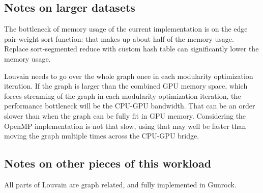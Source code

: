 \documentclass[10pt,article,oneside]{memoir}
\begin{document}
\subsection{Notes on larger datasets}\label{notes-on-larger-datasets-1}

The bottleneck of memory usage of the current implementation is on the
edge pair-weight sort function: that makes up about half of the memory
usage. Replace sort-segmented reduce with custom hash table can
significantly lower the memory usage.

Louvain needs to go over the whole graph once in each modularity
optimization iteration. If the graph is larger than the combined GPU
memory space, which forces streaming of the graph in each modularity
optimization iteration, the performance bottleneck will be the CPU-GPU
bandwidth. That can be an order slower than when the graph can be fully
fit in GPU memory. Considering the OpenMP implementation is not that
slow, using that may well be faster than moving the graph multiple times
across the CPU-GPU bridge.

\subsection{Notes on other pieces of this
workload}\label{notes-on-other-pieces-of-this-workload-1}

All parts of Louvain are graph related, and fully implemented in
Gunrock.
\end{document}
